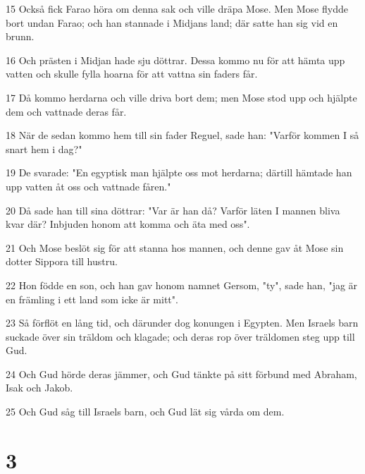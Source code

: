 \par 15 Också fick Farao höra om denna sak och ville dräpa Mose. Men Mose flydde bort undan Farao; och han stannade i Midjans land; där satte han sig vid en brunn.
\par 16 Och prästen i Midjan hade sju döttrar. Dessa kommo nu för att hämta upp vatten och skulle fylla hoarna för att vattna sin faders får.
\par 17 Då kommo herdarna och ville driva bort dem; men Mose stod upp och hjälpte dem och vattnade deras får.
\par 18 När de sedan kommo hem till sin fader Reguel, sade han: "Varför kommen I så snart hem i dag?"
\par 19 De svarade: "En egyptisk man hjälpte oss mot herdarna; därtill hämtade han upp vatten åt oss och vattnade fåren."
\par 20 Då sade han till sina döttrar: "Var är han då? Varför läten I mannen bliva kvar där? Inbjuden honom att komma och äta med oss".
\par 21 Och Mose beslöt sig för att stanna hos mannen, och denne gav åt Mose sin dotter Sippora till hustru.
\par 22 Hon födde en son, och han gav honom namnet Gersom, "ty", sade han, "jag är en främling i ett land som icke är mitt".
\par 23 Så förflöt en lång tid, och därunder dog konungen i Egypten. Men Israels barn suckade över sin träldom och klagade; och deras rop över träldomen steg upp till Gud.
\par 24 Och Gud hörde deras jämmer, och Gud tänkte på sitt förbund med Abraham, Isak och Jakob.
\par 25 Och Gud såg till Israels barn, och Gud lät sig vårda om dem.

\chapter{3}

